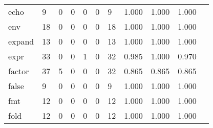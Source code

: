 \begin{longtable}{lp{1.10cm}p{1.10cm}p{1.10cm}p{1.10cm}p{1.10cm}p{1.10cm}p{1.10cm}p{1.10cm}p{1.10cm}p{1.10cm}}
echo      &                      9 &                                  0 &                                 0 &                                0 &                                 0 &                               9 &                          1.000 &                                 1.000 &                               1.000 \\
env       &                     18 &                                  0 &                                 0 &                                0 &                                 0 &                              18 &                          1.000 &                                 1.000 &                               1.000 \\
expand    &                     13 &                                  0 &                                 0 &                                0 &                                 0 &                              13 &                          1.000 &                                 1.000 &                               1.000 \\
expr      &                     33 &                                  0 &                                 0 &                                1 &                                 0 &                              32 &                          0.985 &                                 1.000 &                               0.970 \\
factor    &                     37 &                                  5 &                                 0 &                                0 &                                 0 &                              32 &                          0.865 &                                 0.865 &                               0.865 \\
false     &                      9 &                                  0 &                                 0 &                                0 &                                 0 &                               9 &                          1.000 &                                 1.000 &                               1.000 \\
fmt       &                     12 &                                  0 &                                 0 &                                0 &                                 0 &                              12 &                          1.000 &                                 1.000 &                               1.000 \\
fold      &                     12 &                                  0 &                                 0 &                                0 &                                 0 &                              12 &                          1.000 &                                 1.000 &                               1.000 \\

\end{longtable}
